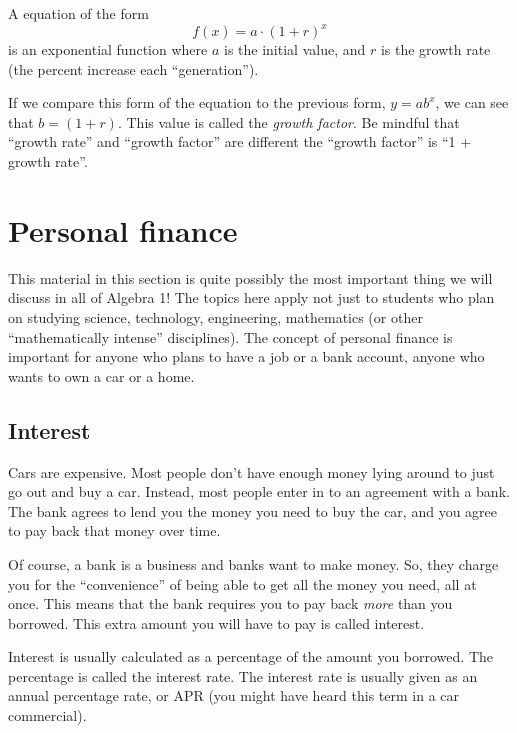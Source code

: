 \begin{boxeddef}
A equation of the form \[f(x) = a\cdot(1+r)^x\] is an exponential function where $a$ is the initial value, and $r$ is the growth rate (the percent increase each ``generation'').
\end{boxeddef}

If we compare this form of the equation to the previous form, $y=ab^x$, we can see that $b=(1+r)$. This value is called the \textit{growth factor}. Be mindful that ``growth rate'' and ``growth factor'' are different the ``growth factor'' is ``1 + growth rate''.


\section{Personal finance}
\label{sec:expofinance}

This material in this section is quite possibly the most important thing we will discuss in all of Algebra 1! The topics here apply not just to students who plan on studying science, technology, engineering, mathematics (or other ``mathematically intense'' disciplines). The concept of personal finance is important for anyone who plans to have a job or a bank account, anyone who wants to own a car or a home.

\subsection{Interest}

Cars are expensive. Most people don't have enough money lying around to just go out and buy a car. Instead, most people enter in to an agreement with a bank. The bank agrees to lend you the money you need to buy the car, and you agree to pay back that money over time.

Of course, a bank is a business and banks want to make money. So, they charge you for the ``convenience'' of being able to get all the money you need, all at once. This means that the bank requires you to pay back \textit{more} than you borrowed. This extra amount you will have to pay is called \gls{interest}.

Interest is usually calculated as a percentage of the amount you borrowed. The percentage is called the \gls{interest rate}. The interest rate is usually given as an annual percentage rate, or APR (you might have heard this term in a car commercial).

